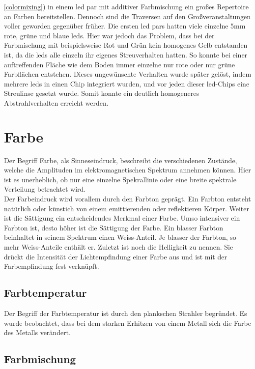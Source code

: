 \documentclass[11pt]{scrartcl}
\begin{document}
\ref{colormixing}) in einem \ac{led} \ac{par} mit additiver Farbmischung ein großes Repertoire an Farben bereitstellen.
Dennoch sind die Traversen auf den Großveranstaltungen voller geworden gegenüber früher.
Die ersten \ac{led} \ac{par}s hatten viele einzelne 5mm rote, grüne und blaue \ac{led}s. Hier war jedoch das Problem, dass bei der Farbmischung
mit beispielsweise Rot und Grün kein homogenes Gelb entstanden ist, da die \ac{led}s alle einzeln ihr eigenes Streuverhalten hatten. So konnte
bei einer auftreffenden Fläche wie dem Boden immer einzelne nur rote oder nur grüne Farbflächen entstehen. Dieses ungewünschte Verhalten wurde
später gelöst, indem mehrere \ac{led}s in einen Chip integriert wurden, und vor jeden dieser \ac{led}-Chips eine Streulinse gesetzt wurde.
Somit konnte ein deutlich homogeneres Abstrahlverhalten erreicht werden.
\clearpage

\section{Farbe}
Der Begriff Farbe, als Sinneseindruck, beschreibt die verschiedenen Zustände, welche die Amplituden im elektromagnetischen Spektrum annehmen können. Hier ist es
unerheblich, ob nur eine einzelne Spekrallinie oder eine breite spektrale Verteilung betrachtet wird.\\
Der Farbeindruck wird vorallem durch den Farbton geprägt. Ein Farbton entsteht natürlich oder künstich von einem emittierenden oder reflektieren Körper.
Weiter ist die Sättigung ein entscheidendes Merkmal einer Farbe. Umso intensiver ein Farbton ist, desto höher ist die Sättigung der Farbe. Ein blasser
Farbton beinhaltet in seinem Spektrum einen Weiss-Anteil. Je blasser der Farbton, so mehr Weiss-Anteile enthält er. Zuletzt ist noch die Helligkeit zu
nennen. Sie drückt die Intensität der Lichtempfindung einer Farbe aus und ist mit der Farbempfindung fest verknüpft.
\subsection{Farbtemperatur}
Der Begriff der Farbtemperatur ist durch den plankschen Strahler begründet. Es wurde beobachtet, dass bei dem starken Erhitzen von einem Metall
sich die Farbe des Metalls verändert.
\subsection{Farbmischung}
\end{document}
